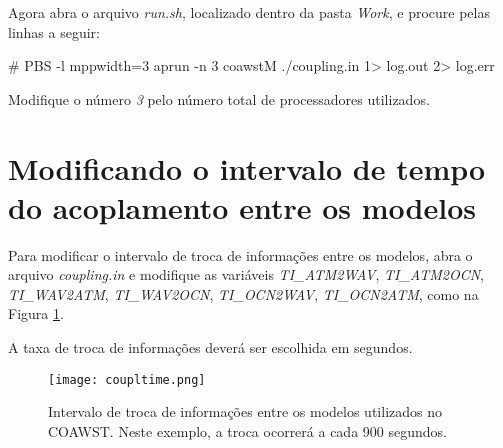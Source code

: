 \noindent Agora abra o arquivo \textit{run.sh}, localizado dentro da pasta \textit{Work}, e procure pelas linhas a seguir:
\bigskip

\begin{bashcode}
\# PBS -l mppwidth=3
aprun -n 3 coawstM ./coupling.in 1> log.out 2> log.err
\end{bashcode}
\bigskip

\noindent Modifique o número \textit{3} pelo número total de processadores utilizados.
\bigskip

\section{Modificando o intervalo de tempo do acoplamento entre os modelos}
\bigskip

\noindent Para modificar o intervalo de troca de informações entre os modelos, abra o arquivo \textit{coupling.in} e modifique as variáveis \textit{TI\_ATM2WAV}, \textit{TI\_ATM2OCN}, \textit{TI\_WAV2ATM}, \textit{TI\_WAV2OCN}, \textit{TI\_OCN2WAV}, \textit{TI\_OCN2ATM}, como na Figura \textcolor{bleu_cite}{\ref{taxaacopla}}.
\bigskip

\begin{tcolorbox}[enhanced,
  grow to left by=0cm,%
  grow to right by=0cm,%
  enlarge top by=0cm,%
  enlarge bottom by=0cm,%
  tcbox raise base,
  boxrule=1.0pt,
  left=18mm,
  colframe=red!50!black,coltext=red!25!black,colback=red!10!white,
  overlay={\begin{tcbclipinterior}\fill[red!75!blue!50!white] (frame.south west)
    rectangle node[text=white,font=\sffamily\bfseries\footnotesize,rotate=0] {ATENÇÃO} ([xshift=18mm]frame.north west);\end{tcbclipinterior}}]
A taxa de troca de informações deverá ser escolhida em segundos.
\end{tcolorbox}
\bigskip

\begin{figure}[H]
    \centering
    \texttt{[image: coupltime.png]}
    \caption{Intervalo de troca de informações entre os modelos utilizados no COAWST. Neste exemplo, a troca ocorrerá a cada 900 segundos.}
    \label{taxaacopla}
\end{figure}
\bigskip
